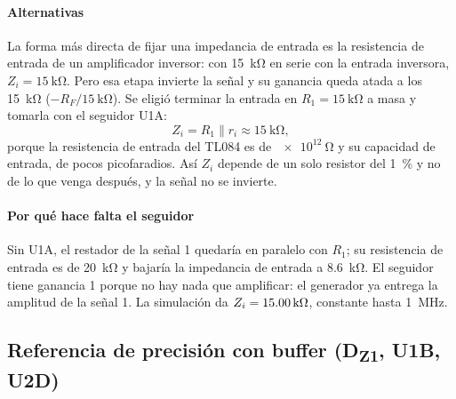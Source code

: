 \paragraph*{Alternativas} La forma más directa de fijar una impedancia de entrada es la resistencia de entrada de un amplificador inversor: con \SI{15}{\kilo\ohm} en serie con la entrada inversora, $Z_i = \SI{15}{\kilo\ohm}$. Pero esa etapa invierte la señal y su ganancia queda atada a los \SI{15}{\kilo\ohm} ($-R_F/\SI{15}{\kilo\ohm}$). Se eligió terminar la entrada en $R_1 = \SI{15}{\kilo\ohm}$ a masa y tomarla con el seguidor U1A:
\begin{equation}
Z_i = R_1 \parallel r_i \approx \SI{15}{\kilo\ohm},
\end{equation}
porque la resistencia de entrada del TL084 es de $\SI{e12}{\ohm}$ y su capacidad de entrada, de pocos picofaradios. Así $Z_i$ depende de un solo resistor del \SI{1}{\percent} y no de lo que venga después, y la señal no se invierte.

\paragraph*{Por qué hace falta el seguidor} Sin U1A, el restador de la señal 1 quedaría en paralelo con $R_1$; su resistencia de entrada es de \SI{20}{\kilo\ohm} y bajaría la impedancia de entrada a \SI{8,6}{\kilo\ohm}. El seguidor tiene ganancia 1 porque no hay nada que amplificar: el generador ya entrega la amplitud de la señal 1. La simulación da $Z_i = \valu{2}{\simZin}{\kilo\ohm}$, constante hasta \SI{1}{\mega\hertz}.

\subsection{Referencia de precisión con buffer (D\textsubscript{Z1}, U1B, U2D)}
\label{sec:ref}
